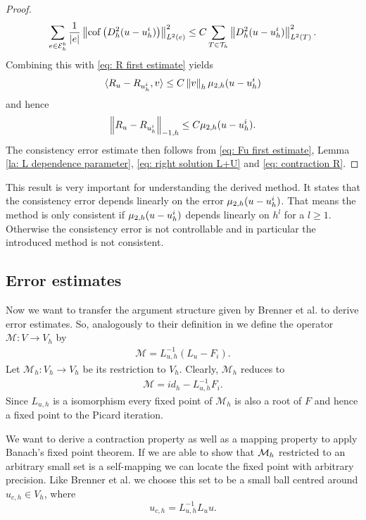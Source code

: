 \begin{proof}
	\begin{align}
	\sum_{e \in \mathcal{E}_h^b} \frac 1 {|e|} \left\lVert  \operatorname{cof} \left( D_h^2 (u-u_h^i) \right) \right\rVert_{L^2(e)}^2 
	\leq C \sum_{T \in \mathcal{T}_h} \left\lVert D_h^2 (u-u_h^i) \right\rVert_{L^2(T)}^2.
	\end{align}
	Combining this with \eqref{eq: R first estimate} yields
	\begin{align*}
	 \langle R_u - R_{u^i_h}, v \rangle \leq C \left\lVert v \right\rVert_{h} \mu_{2,h}(u-u_h^i)
	\end{align*}
	and hence 
	\begin{align}
	\left\lVert R_u - R_{u^i_h} \right\rVert_{-1,h} \leq C \mu_{2,h}(u-u_h^i). \label{eq: contraction R}
	\end{align}
	The consistency error estimate then follows from \eqref{eq: Fu first estimate}, Lemma \ref{la: L dependence parameter}, \eqref{eq: right solution L+U} and \eqref{eq: contraction R}.
\end{proof}

This result is very important for understanding the derived method. It states that the consistency error depends linearly on the error $\mu_{2,h}(u-u^i_h)$. That means the method is only consistent if $\mu_{2,h}(u-u^i_h)$ depends linearly on $h^l$ for a $l \geq 1$. Otherwise the consistency error is not controllable and in particular the introduced method is not consistent.

\subsection{Error estimates}
Now we want to transfer the argument structure given by Brenner et al. to derive error estimates. So, analogously to their definition in \cite[(3.1)]{BGN+2011} we define the operator $\mathcal M: V \rightarrow V_h$ by
\begin{align}
	\mathcal M = L_{u,h}^{-1}(L_{u} - F_i).
\end{align}
Let $\mathcal M_h:V_h \rightarrow V_h$ be its restriction to $V_h$. Clearly, $\mathcal M_h$ reduces to 
\begin{align}
\mathcal M = id_h - L_{u,h}^{-1}F_i.
\end{align}
Since $L_{u,h}$ is a isomorphism every fixed point of $\mathcal M_h$ is also a root of $F$ and hence a fixed point to the Picard iteration.

We want to derive a contraction property as well as a mapping property to apply Banach's fixed point theorem. If we are able to show that $\mathcal M_h$ restricted to an arbitrary small set is a self-mapping we can locate the fixed point with arbitrary precision. Like Brenner et al. \cite[(3.3)]{BGN+2011} we choose this set to be a small ball centred around $u_{c,h}\in V_h$, where
\[
u_{c,h} = L_{u,h}^{-1} L_u u.
\]

